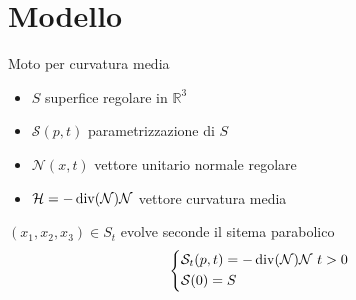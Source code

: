 \section{Modello}
\begin{frame}{Moto per curvatura media}
     \begin{block}{}
       \begin{itemize}
       \item $S$ superfice regolare in $\mathbb{R}^3$
       \item $\mathcal{S}(p,t)$ parametrizzazione di $S$
       \item $\mathcal{N}(x,t)$ vettore unitario normale regolare
       \item $\mathcal{H}=-\operatorname{div}(\mathcal{N})\mathcal{N}$ vettore curvatura media
       \end{itemize}
     \end{block}
     \begin{block}{}
       $(x_1,x_2,x_3)\in S_t$ evolve seconde il sitema parabolico
       \[
       \left\{
       \begin{aligned}
         &\mathcal{S}_t(p,t)=-\operatorname{div}(\mathcal{N})\mathcal{N}\text{ $t>0$} \\
         &\mathcal{S}(0)=S
       \end{aligned}
       \right.
       \]
     \end{block}
\end{frame}
